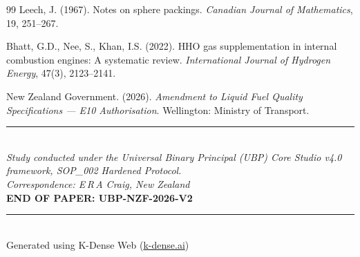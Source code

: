 \documentclass[12pt,a4paper]{article}
\begin{document}
\begin{thebibliography}{99}
Leech, J. (1967).
Notes on sphere packings.
\textit{Canadian Journal of Mathematics}, 19, 251--267.

Bhatt, G.D., Nee, S., Khan, I.S. (2022).
HHO gas supplementation in internal combustion engines: A systematic review.
\textit{International Journal of Hydrogen Energy}, 47(3), 2123--2141.

New Zealand Government. (2026).
\textit{Amendment to Liquid Fuel Quality Specifications --- E10 Authorisation}.
Wellington: Ministry of Transport.

\end{thebibliography}

\vspace{1.5cm}
\begin{center}
\small\color{gray}
\rule{0.6\linewidth}{0.3pt}\\[4pt]
\textit{Study conducted under the Universal Binary Principal (UBP) Core Studio v4.0
framework, SOP\_002 Hardened Protocol.}\\[2pt]
\textit{Correspondence: E\,R\,A Craig, New Zealand}\\[4pt]
\textbf{END OF PAPER: UBP-NZF-2026-V2}\\[6pt]
\rule{0.5\linewidth}{0.3pt}\\[4pt]
Generated using K-Dense Web (\href{https://k-dense.ai}{k-dense.ai})
\end{center}
\end{document}

